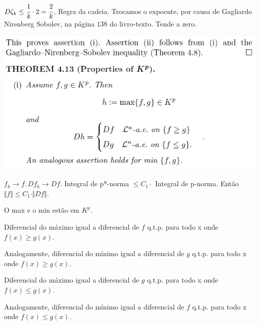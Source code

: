 \documentclass[12pt]{article}
\begin{document}
$D\zeta_k \le \cfrac{1}{k}\cdot 2 = \cfrac{2}{k}$. Regra da cadeia. Trocamos o expoente, por causa de Gagliardo Nirenberg Sobolev, na p\'agina $138$ do livro-texto. Tende a zero.

\vspace{300mm}

		\begin{center}
		\includegraphics{4}
		\end{center}

$f_k \to f.\,Df_k \to Df.$ Integral de p*-norma $\le C_1\cdot$ Integral de p-norma. Ent\~ao $\Vert f\Vert \le C_1\cdot \Vert Df\Vert$.

\vspace{3mm}

O max e o min est\~ao em $K^p$.

Diferencial do m\'aximo igual a diferencial de $f$ q.t.p. para todo x onde $f(x) \ge g(x)$.

Analogamente, diferencial do m\'inimo igual a diferencial de $g$ q.t.p. para todo x onde $f(x) \ge g(x)$.

\vspace{3mm}

Diferencial do m\'aximo igual a diferencial de $g$ q.t.p. para todo x onde $f(x) \le g(x)$.

Analogamente, diferencial do m\'inimo igual a diferencial de $f$ q.t.p. para todo x onde $f(x) \le g(x)$.

\vspace{300mm}
\end{document}
